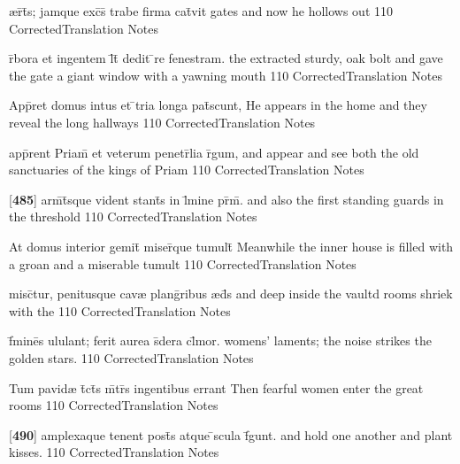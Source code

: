 \latline
  {{\ae}r\={}t\={}s; jamque exc\={\macron {\i}}s\={} trabe firma cat\={}vit}
  { gates and now he hollows out  }
  {110}
  { CorrectedTranslation }
  { Notes }


\latline
  {r\={}bora et ingentem l\={}t\={} dedit \={}re fenestram.}
  { the extracted sturdy, oak bolt and gave the gate a giant window with a yawning mouth }
  {110}
  { CorrectedTranslation }
  { Notes }


\latline
  {App\={}ret domus intus et \={}tria longa pat\={}scunt,}
  { He appears in the home and they reveal the long hallways }
  {110}
  { CorrectedTranslation }
  { Notes }


\latline
  {app\={}rent Priam\={\macron {\i}} et veterum penetr\={}lia r\={}gum,}
  { and appear and see both the old sanctuaries of the kings of Priam }
  {110}
  { CorrectedTranslation }
  { Notes }


\latline
  {[\textbf{485}] arm\={}t\={}sque vident stant\={\macron {\i}}s in l\={\macron {\i}}mine pr\={\macron {\i}}m\={}.}
  { and also the first standing guards in the threshold }
  {110}
  { CorrectedTranslation }
  { Notes }


\latline
  {At domus interior gemit\={} miser\={}que tumult\={}}
  { Meanwhile the inner house is filled with a groan and a miserable tumult }
  {110}
  { CorrectedTranslation }
  { Notes }


\latline
  {misc\={}tur, penitusque cav{\ae} plang\={}ribus {\ae}d\={}s}
  { and deep inside the vaultd rooms shriek with the  }
  {110}
  { CorrectedTranslation }
  { Notes }


\latline
  {f\={}mine\={\macron {\i}}s ululant; ferit aurea s\={\macron {\i}}dera cl\={}mor.}
  { womens' laments; the noise strikes the golden stars. }
  {110}
  { CorrectedTranslation }
  { Notes }


\latline
  {Tum pavid{\ae} t\={}ct\={\macron {\i}}s m\={}tr\={}s ingentibus errant}
  { Then fearful women enter the great rooms }
  {110}
  { CorrectedTranslation }
  { Notes }


\latline
  {[\textbf{490}] amplexaque tenent post\={\macron {\i}}s atque \={}scula f\={\macron {\i}}gunt.}
  { and hold one another and plant kisses. }
  {110}
  { CorrectedTranslation }
  { Notes }


